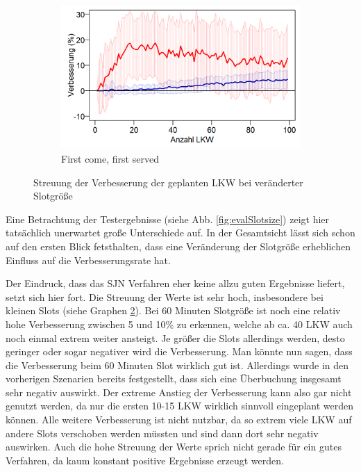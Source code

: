 \begin{figure}[H]
\begin{subfigure}{.5\textwidth}
  \centering
  \includegraphics[width=\linewidth]{images/graphs/rsSlotsizeFcfs_Streuung.png}
  \caption{First come, first served}
  \label{fig:eofs3}
\end{subfigure}
\caption{Streuung der Verbesserung der geplanten LKW bei veränderter Slotgröße}
\label{fig:evalSlotsizeStreuung}
\end{figure}

Eine Betrachtung der Testergebnisse (siehe Abb. \ref{fig:evalSlotsize}) zeigt hier tatsächlich unerwartet große Unterschiede auf. In der Gesamtsicht lässt sich schon auf den ersten Blick fetsthalten, dass eine Veränderung der Slotgröße erheblichen Einfluss auf die Verbesserungsrate hat. 

Der Eindruck, dass das SJN Verfahren eher keine allzu guten Ergebnisse liefert, setzt sich hier fort. Die Streuung der Werte ist sehr hoch, insbesondere bei kleinen Slots (siehe Graphen \ref{fig:evalSlotsizeStreuung}). Bei 60 Minuten Slotgröße ist noch eine relativ hohe Verbesserung zwischen 5 und 10\% zu erkennen, welche ab ca. 40 LKW auch noch einmal extrem weiter ansteigt. Je größer die Slots allerdings werden, desto geringer oder sogar negativer wird die Verbesserung. Man könnte nun sagen, dass die Verbesserung beim 60 Minuten Slot wirklich gut ist. Allerdings wurde in den vorherigen Szenarien bereits festgestellt, dass sich eine Überbuchung insgesamt sehr negativ auswirkt. Der extreme Anstieg der Verbesserung kann also gar nicht genutzt werden, da nur die ersten 10-15 LKW wirklich sinnvoll eingeplant werden können. Alle weitere Verbesserung ist nicht nutzbar, da so extrem viele LKW auf andere Slots verschoben werden müssten und sind dann dort sehr negativ auswirken. Auch die hohe Streuung der Werte sprich nicht gerade für ein gutes Verfahren, da kaum konstant positive Ergebnisse erzeugt werden.

